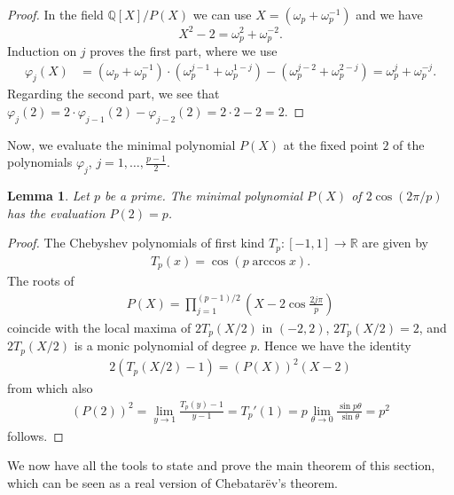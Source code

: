 \documentclass[a4paper]{article}
\renewcommand{\o}{\omega}
\newcommand{\Q}{\ensuremath{\mathbb{Q}}}
\newcommand{\R}{\ensuremath{\mathbb{R}}}
\newtheorem{lemma}[theorem]{Lemma}
\numberwithin{equation}{section}
\numberwithin{table}{section}
\numberwithin{figure}{section}
\begin{document}
\begin{proof}
    In the field $\Q[X]/P(X)$ we can use $X=(\o_p+\o_p^{-1})$ and we have
    \[X^2-2=\o_p^2+\o_p^{-2}.\]
    Induction on $j$ proves the first part, where we use
    \begin{align*}
        \varphi_j(X) &= (\o_p+\o_p^{-1}) \cdot (\o_p^{j-1}+\o_p^{1-j}) - (\o_p^{j-2}+\o_p^{2-j})
        = \o_p^j + \o_p^{-j}.
    \end{align*}
    Regarding the second part, we see that $\varphi_j(2)=2 \cdot \varphi_{j-1}(2)-\varphi_{j-2}(2) 
    =2 \cdot 2-2
    =2$.
\end{proof}

Now, we evaluate the minimal polynomial $P(X)$ at the fixed point $2$ of the polynomials $\varphi_j$, $j=1,\ldots,\frac{p-1}{2}$.

\begin{lemma}\label{evaluationCosineMinPoly}
    Let $p$ be a prime. The minimal polynomial $P(X)$ of $2 \cos ( 2 \pi /p)$ has the evaluation $P(2)=p$.
\end{lemma}

\begin{proof}
 The Chebyshev polynomials of first kind $T_p\colon[-1,1]\to\R$ are given by
 \begin{align*}
     T_p( x)=\cos(p\arccos x).
 \end{align*}
 The roots of
 \begin{align*}
  P(X)=\prod_{j=1}^{(p-1)/2}\left(X-2\cos\frac{2 j \pi}{p}\right)
 \end{align*}
 coincide with the local maxima of $2T_p(X/2)$ in $(-2,2)$, $2T_p(X/2)=2$, and $2T_p(X/2)$ is a monic polynomial of degree $p$. Hence we have the identity
 \begin{align*}
  2(T_p(X/2)-1)=(P(X))^2(X-2)    
 \end{align*}
 from which also
 \begin{align*}
 (P(2))^2
 =\lim_{y\to 1} \frac{T_p(y)-1}{y-1}=T_p'(1)=p\lim_{\theta \to 0}\frac{\sin p\theta}{\sin\theta} = p^2    
 \end{align*}
 follows.
\end{proof}

We now have all the tools to state and prove the main theorem of this section, which can be seen as a real version of Chebatar\"ev's theorem. 
\end{document}
